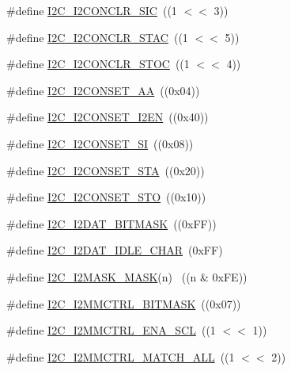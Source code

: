 \begin{DoxyCompactItemize}
\#define \hyperlink{group__I2C__17XX__40XX_ga36753112210a8c33d566b572b63b753b}{I2\+C\+\_\+\+I2\+C\+O\+N\+C\+L\+R\+\_\+\+S\+IC}~((1 $<$$<$ 3))
\item 
\#define \hyperlink{group__I2C__17XX__40XX_gab6148bf41d7fc32bd259d2f6a7d7667d}{I2\+C\+\_\+\+I2\+C\+O\+N\+C\+L\+R\+\_\+\+S\+T\+AC}~((1 $<$$<$ 5))
\item 
\#define \hyperlink{group__I2C__17XX__40XX_ga449d7af35550484c4dfefcddd01095b8}{I2\+C\+\_\+\+I2\+C\+O\+N\+C\+L\+R\+\_\+\+S\+T\+OC}~((1 $<$$<$ 4))
\item 
\#define \hyperlink{group__I2C__17XX__40XX_ga784c4b2fe7f3299e338655d2ddbf283c}{I2\+C\+\_\+\+I2\+C\+O\+N\+S\+E\+T\+\_\+\+AA}~((0x04))
\item 
\#define \hyperlink{group__I2C__17XX__40XX_gab836acc31e0572bb0d0db614f0641f15}{I2\+C\+\_\+\+I2\+C\+O\+N\+S\+E\+T\+\_\+\+I2\+EN}~((0x40))
\item 
\#define \hyperlink{group__I2C__17XX__40XX_gaa447cd2686805ef8009fc599144ee3dc}{I2\+C\+\_\+\+I2\+C\+O\+N\+S\+E\+T\+\_\+\+SI}~((0x08))
\item 
\#define \hyperlink{group__I2C__17XX__40XX_gabaad3370eb35644c135d40f06adbbba0}{I2\+C\+\_\+\+I2\+C\+O\+N\+S\+E\+T\+\_\+\+S\+TA}~((0x20))
\item 
\#define \hyperlink{group__I2C__17XX__40XX_gaae292803a059b84eac20ab8777d113af}{I2\+C\+\_\+\+I2\+C\+O\+N\+S\+E\+T\+\_\+\+S\+TO}~((0x10))
\item 
\#define \hyperlink{group__I2C__17XX__40XX_gac66b7c81c93cc59f69d204b4eb7d639b}{I2\+C\+\_\+\+I2\+D\+A\+T\+\_\+\+B\+I\+T\+M\+A\+SK}~((0x\+F\+F))
\item 
\#define \hyperlink{group__I2C__17XX__40XX_ga5b04af302e0e4007df123dff0328ac5e}{I2\+C\+\_\+\+I2\+D\+A\+T\+\_\+\+I\+D\+L\+E\+\_\+\+C\+H\+AR}~(0x\+F\+F)
\item 
\#define \hyperlink{group__I2C__17XX__40XX_ga44068704cf00223c47f6880322dcf67c}{I2\+C\+\_\+\+I2\+M\+A\+S\+K\+\_\+\+M\+A\+SK}(n)                ~((n \& 0x\+F\+E))
\item 
\#define \hyperlink{group__I2C__17XX__40XX_gadca0b6beb066a8f6689960c687334ac2}{I2\+C\+\_\+\+I2\+M\+M\+C\+T\+R\+L\+\_\+\+B\+I\+T\+M\+A\+SK}~((0x07))
\item 
\#define \hyperlink{group__I2C__17XX__40XX_gabf11567c27c48d795ba0f92cf636dab6}{I2\+C\+\_\+\+I2\+M\+M\+C\+T\+R\+L\+\_\+\+E\+N\+A\+\_\+\+S\+CL}~((1 $<$$<$ 1))
\item 
\#define \hyperlink{group__I2C__17XX__40XX_gac7dd5efba503dd79c6b42f3575f70307}{I2\+C\+\_\+\+I2\+M\+M\+C\+T\+R\+L\+\_\+\+M\+A\+T\+C\+H\+\_\+\+A\+LL}~((1 $<$$<$ 2))
$$
\end{DoxyCompactItemize}
